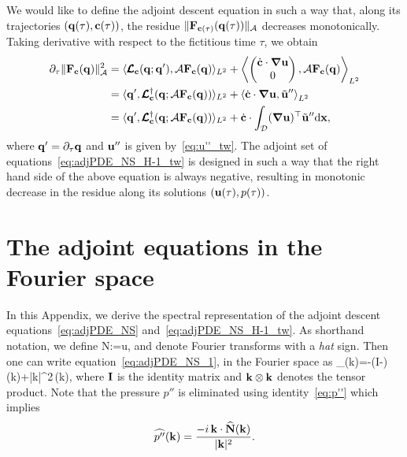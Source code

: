 \documentclass{article}
\begin{document}
We would like to define the adjoint descent equation in such a way that, along its trajectories
$(\mathbf q(\tau),\mathbf c(\tau))$, the residue $\|\mathbf F_{\mathbf c(\tau)}(\mathbf q(\tau))\|_{\mathcal A}$
decreases monotonically. Taking derivative with respect to the fictitious time $\tau$, we obtain
\begin{align}
\partial_\tau\|\mathbf F_{\mathbf c}(\mathbf q)\|^2_{\mathcal A}&=
\langle\pmb{\mathcal L}_{\mathbf c}(\mathbf q;\mathbf q'),\mathcal A\mathbf F_{\mathbf c}(\mathbf q)\rangle_{L^2}+
\left\langle
\begin{pmatrix}
\dot{\mathbf c}\cdot\mbox{\boldmath $\nabla$}\mathbf u\\
0
\end{pmatrix},
\mathcal A\mathbf F_{\mathbf c}(\mathbf q)
\right\rangle_{L^2}\nonumber\\
&=\langle\mathbf q',\pmb{\mathcal L}_{\mathbf c}^\dagger(\mathbf q;\mathcal A\mathbf F_{\mathbf c}(\mathbf q))\rangle_{L^2}+
\left\langle
\dot{\mathbf c}\cdot\mbox{\boldmath $\nabla$}\mathbf u,
\tilde{\mathbf u}''
\right\rangle_{L^2}\nonumber\\
&=\langle\mathbf q',\pmb{\mathcal L}_{\mathbf c}^\dagger(\mathbf q;\mathcal A\mathbf F_{\mathbf c}(\mathbf q))\rangle_{L^2}+
\dot{\mathbf c}\cdot\int_{\mathcal D}(\mbox{\boldmath $\nabla$}\mathbf u)^\top
\tilde{\mathbf u}''\mathrm d\mathbf x,
\end{align}
where $\mathbf q'=\partial_\tau \mathbf q$ and $\mathbf u''$ is given by~\eqref{eq:u''_tw}. The adjoint set
of equations~\eqref{eq:adjPDE_NS_H-1_tw} is designed in such a way that the
right hand side of the above equation is always negative, resulting in
monotonic decrease in the residue along its solutions $(\mathbf u(\tau),p(\tau))$.

\section{The adjoint equations in the Fourier space}\label{app:adj_fs}
In this Appendix, we derive the spectral representation of the adjoint descent
equations~\eqref{eq:adjPDE_NS} and~\eqref{eq:adjPDE_NS_H-1_tw}. As shorthand notation,
we define
\beq
\vc N:=\vc u,
\eeq
and denote Fourier transforms with a \emph{hat} sign. Then one can write
equation~\eqref{eq:adjPDE_NS_1}, in the Fourier space as
\beq
\partial_\tau{}(\vc k)=-\left(\vc I-\right)
(\vc k)+\nu |\vc k|^2\,(\vc k),
\label{eq:adjPDE_fs}
\eeq
where $\mathbf I$ is the identity matrix and $\mathbf k\otimes\mathbf k$ denotes the tensor product.
Note that the pressure $p''$ is eliminated using
identity~\eqref{eq:p''} which implies
$$\widehat{p''}(\mathbf k)=\frac{-i\,\mathbf k\cdot \widehat{\mathbf N}(\mathbf k)}{|\mathbf k|^2}.$$
\end{document}
